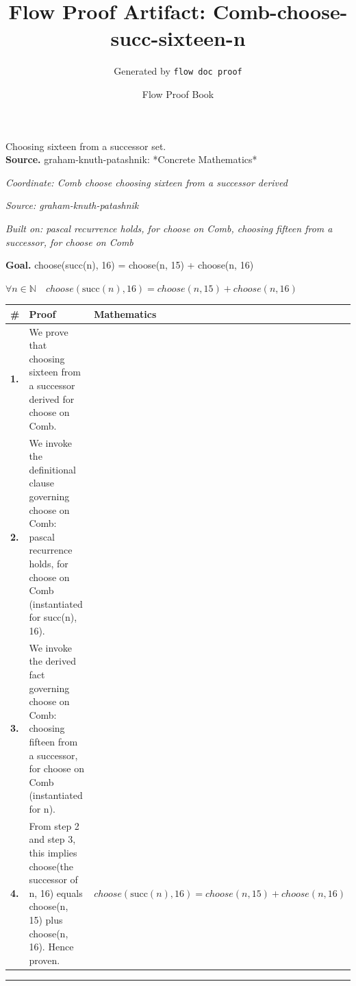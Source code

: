 \documentclass[11pt]{article}
\title{Flow Proof Artifact: Comb-choose-succ-sixteen-n}
\author{Generated by \texttt{flow doc proof}}
\date{Flow Proof Book}
\theoremstyle{definition}
\begin{document}
\maketitle
Choosing sixteen from a successor set.\\[0.5em]
\textbf{Source.} graham-knuth-patashnik: *Concrete Mathematics*\\[0.5em]
\bigskip
{}\par
\smallskip\noindent\textit{Coordinate: Comb \cdot choose \cdot choosing sixteen from a successor derived}\par
\smallskip\noindent\textit{Source: graham-knuth-patashnik}\par
\smallskip\noindent\textit{Built on: pascal recurrence holds, for choose on Comb, choosing fifteen from a successor, for choose on Comb}\par
\medskip
\noindent\textbf{Goal.} choose(succ(n), 16) = choose(n, 15) + choose(n, 16)\par
\noindent$\displaystyle \forall n \in \mathbb{N}\quad choose(\mathrm{succ}(n), 16) = choose(n, 15) + choose(n, 16)$\par
\medskip
\noindent
\begin{tabular}{@{} >{\raggedright\arraybackslash}p{} >{\raggedright\arraybackslash}p{} >{\raggedleft\arraybackslash}p{} @{}}
\textbf{\#} & \textbf{Proof} & \textbf{Mathematics} \\
\midrule
\textbf{1.} & We prove that choosing sixteen from a successor derived for choose on Comb. & \\[0.45em]
\textbf{2.} & We invoke the definitional clause governing choose on Comb: pascal recurrence holds, for choose on Comb (instantiated for succ(n), 16). & \\[0.45em]
\textbf{3.} & We invoke the derived fact governing choose on Comb: choosing fifteen from a successor, for choose on Comb (instantiated for n). & \\[0.45em]
\textbf{4.} & From step 2 and step 3, this implies choose(the successor of n, 16) equals choose(n, 15) plus choose(n, 16). Hence proven. & $\displaystyle choose(\mathrm{succ}(n), 16) = choose(n, 15) + choose(n, 16)$ \\[0.45em]
\bottomrule
\end{tabular}
\label{thm:Comb-choose-choosing_sixteen_from_a_successor_derived}
\par\medskip\hrule
\end{document}
